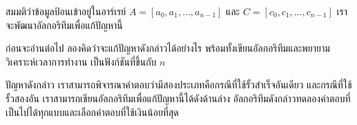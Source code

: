 สมมติ{\wbr}ว่า{\wbr}ข้อมูล{\wbr}ป้อน{\wbr}เข้า{\wbr}อยู่{\wbr}ใน{\wbr}อาร์เรย์ $A=[a_0,a_1,\ldots,a_{n-1}]$ และ{\wbr}
$C=[c_0,c_1,\ldots,c_{n-1}]$  เรา{\wbr}จะ{\wbr}พัฒนา{\wbr}อัล{\wbr}กอ{\wbr}ริ{\wbr}ทึม{\wbr}เพื่อ{\wbr}แก้{\wbr}ปัญหา{\wbr}นี้{\wbr}

\begin{quiz}{}
ก่อน{\wbr}จะ{\wbr}อ่าน{\wbr}ต่อไป ลอง{\wbr}คิด{\wbr}ว่า{\wbr}จะ{\wbr}แก้{\wbr}ปัญหา{\wbr}ดังกล่าว{\wbr}ได้{\wbr}อย่างไร{\wbr}
พร้อมทั้ง{\wbr}เขียน{\wbr}อัล{\wbr}กอ{\wbr}ริ{\wbr}ทึม{\wbr}และ{\wbr}พยายาม{\wbr}วิเคราะห์{\wbr}เวลา{\wbr}การ{\wbr}ทำงาน เป็น{\wbr}ฟังก์ชัน{\wbr}ที่{\wbr}ขึ้น{\wbr}กับ $n$
\end{quiz}

ปัญหา{\wbr}ดังกล่าว เรา{\wbr}สามารถ{\wbr}พิจารณา{\wbr}คำตอบ{\wbr}ว่า{\wbr}มี{\wbr}สอง{\wbr}ประเภท{\wbr}คือ{\wbr}กรณี{\wbr}ที่{\wbr}ใช้{\wbr}รั้ว{\wbr}สำเร็จ{\wbr}อัน{\wbr}เดียว{\wbr}
และ{\wbr}กรณี{\wbr}ที่{\wbr}ใช้{\wbr}รั้ว{\wbr}สอง{\wbr}อัน เรา{\wbr}สามารถ{\wbr}เขียน{\wbr}อัล{\wbr}กอ{\wbr}ริ{\wbr}ทึม{\wbr}เพื่อ{\wbr}แก้{\wbr}ปัญหา{\wbr}นี้{\wbr}ได้{\wbr}ดัง{\wbr}ด้าน{\wbr}ล่าง{\wbr}
อัล{\wbr}กอ{\wbr}ริ{\wbr}ทึม{\wbr}ดังกล่าว{\wbr}ทดลอง{\wbr}คำตอบ{\wbr}ที่{\wbr}เป็น{\wbr}ไป{\wbr}ได้{\wbr}ทุก{\wbr}แบบ{\wbr}และ{\wbr}เลือก{\wbr}คำตอบ{\wbr}ที่{\wbr}ใช้{\wbr}เงิน{\wbr}น้อย{\wbr}ที่สุด{\wbr}

